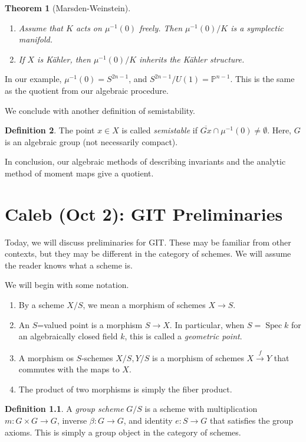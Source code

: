 \documentclass[leqno, openany]{memoir}
\newtheorem{thm}{Theorem}[section]
\theoremstyle{definition}
\newtheorem{defn}[thm]{Definition}
\theoremstyle{remark}
\theoremstyle{plain}
\theoremstyle{definition}
\theoremstyle{remark}
\renewcommand{\P}{\mathbb{P}}
\newcommand{\ol}[1]{\overline{#1}}
\DeclareMathOperator{\Spec}{Spec}
\begin{document}
\begin{thm}[Marsden-Weinstein] \begin{enumerate} \item Assume that $K$ acts on
$\mu^{-1}(0)$ freely. Then $\mu^{-1}(0) / K$ is a symplectic manifold.  \item
If $X$ is K\"ahler, then $\mu^{-1}(0) / K$ inherits the K\"ahler structure.
\end{enumerate} \end{thm}

In our example, $\mu^{-1}(0) = S^{2n-1}$, and $S^{2n-1} / U(1) = \P^{n-1}$.
This is the same as the quotient from our algebraic procedure.

We conclude with another definition of semistability.

\begin{defn} The point $x \in X$ is called \textit{semistable} if $\ol{Gx} \cap
\mu^{-1}(0) \neq \emptyset$. Here, $G$ is an algebraic group (not necessarily
compact).  \end{defn}

In conclusion, our algebraic methods of describing invariants and the analytic
method of moment maps give a quotient.

\chapter{Caleb (Oct 2): GIT Preliminaries}%
\label{cha:caleb_oct_2_git_preliminaries}

Today, we will discuss preliminaries for GIT. These may be familiar from other
contexts, but they may be different in the category of schemes. We will assume
the reader knows what a scheme is.

We will begin with some notation.  \begin{enumerate} \item By a scheme $X/S$,
    we mean a morphism of schemes $X \to S$.  \item An $S$=valued point is a
    morphism $S \to X$. In particular, when $S = \Spec k$ for an algebraically
    closed field $k$, this is called a \textit{geometric point}.  \item A
    morphism os $S$-schemes $X/S,Y/S$ is a morphism of schemes $X
    \xrightarrow{f} Y$ that commutes with the maps to $X$.  \item The product
    of two morphisms is simply the fiber product.  \end{enumerate}

\begin{defn} A \textit{group scheme}  $G / S$ is a scheme with multiplication
    $m \colon G \times G \to G$, inverse $\beta \colon G \to G$, and identity
    $e \colon S \to G$ that satisfies the group axioms. This is simply a group
    object in the category of schemes.  \end{defn}
\end{document}
